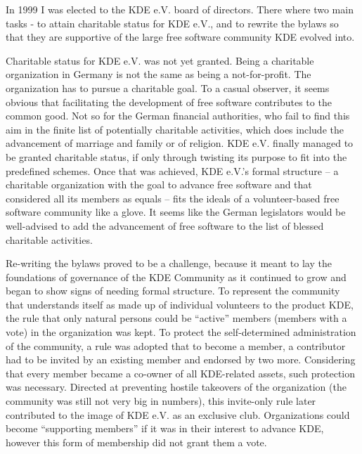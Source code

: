 In 1999 I was elected to the KDE e.V. board of directors. There where
two main tasks - to attain charitable status for KDE
e.V., and to rewrite the bylaws so that they are supportive of
the large free software community KDE evolved into.

Charitable status for KDE e.V. was not yet granted. Being a charitable
organization in Germany is not the same as being a not-for-profit. The
organization has to pursue a charitable goal. To a
casual observer, it seems obvious that facilitating the development of
free software contributes to the common good. Not so for the German
financial authorities, who fail to find this aim in the finite
list of potentially charitable activities, which does include the
advancement of marriage and family or of religion. KDE e.V. finally
managed to be granted charitable status, if only through twisting its
purpose to fit into the predefined schemes. Once that was achieved,
KDE e.V.'s formal structure -- a charitable organization with the goal
to advance free software and that considered all its members as
equals -- fits the ideals of a volunteer-based free software community
like a glove. It seems like the
German legislators would be well-advised to add the advancement of
free software to the list of blessed charitable activities.

Re-writing the bylaws proved to be a challenge, because it meant to
lay the foundations of governance of the KDE Community as it continued
to grow and began to show signs of needing formal structure.
To represent the community that understands itself as made up of
individual volunteers to the product KDE, the rule that only natural
persons could be ``active'' members (members with a vote) in the
organization was kept. To protect the self-determined administration of
the community, a rule was adopted that to become a member, a
contributor had to be invited by an existing member and endorsed by
two more. Considering that every member became a co-owner of all
KDE-related assets, such protection was necessary. Directed at
preventing hostile takeovers of the organization 
(the community was still not very big in numbers), this invite-only
rule later contributed to the image of KDE e.V. as an exclusive
club. Organizations could become ``supporting members'' if it was in
their interest to advance KDE, however this form of membership did not
grant them a vote.

